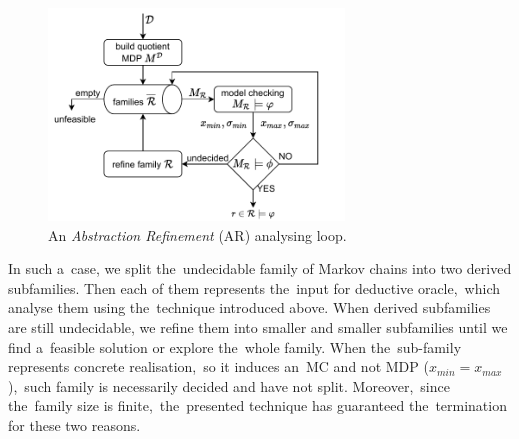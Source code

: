 \begin{figure}[h!]
\centering
\includegraphics[width=0.70\textwidth]{figures/ar_loop.pdf}
\caption{An \textit{Abstraction Refinement} (AR) analysing loop.}%
\label{fig:architecture}%
\end{figure}


In such a~case, we split the~undecidable family of Markov chains into two derived subfamilies. 
Then each of them represents the~input for deductive oracle,~which analyse them using the~technique introduced above.
When derived subfamilies are still undecidable, we refine them into smaller and smaller subfamilies until we find a~feasible solution or explore the~whole family.
When the~sub-family represents concrete realisation,~so it induces an~MC and not MDP ($x_{min} = x_{max}$),~such family is necessarily decided and have not split.
Moreover,~since the~family size is finite,~the~presented technique has guaranteed the~termination for these two reasons.
 
